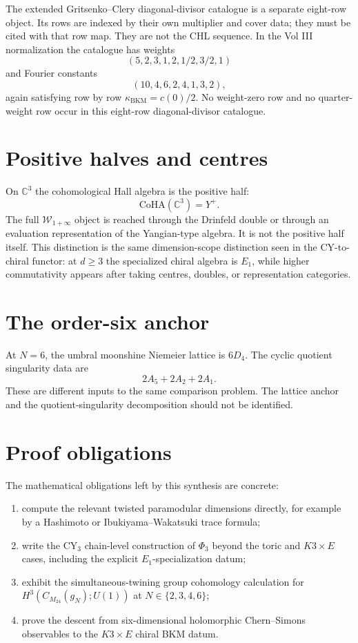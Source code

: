 \documentclass[11pt]{article}
\providecommand{\C}{\mathbb{C}}
\providecommand{\CoHA}{\mathrm{CoHA}}
\providecommand{\Yplus}{Y^+}
\providecommand{\kBKM}{\kappa_{\mathrm{BKM}}}
\begin{document}
The extended Gritsenko--Clery diagonal-divisor catalogue is a separate
eight-row object.  Its rows are indexed by their own multiplier and
cover data; they must be cited with that row map. They are not the
CHL sequence.  In the Vol III normalization the catalogue has
weights
\[
  (5,2,3,1,2,1/2,3/2,1)
\]
and Fourier constants
\[
  (10,4,6,2,4,1,3,2),
\]
again satisfying row by row $\kBKM=c(0)/2$.  No weight-zero row and no
quarter-weight row occur in this eight-row diagonal-divisor catalogue.

\section{Positive halves and centres}

On $\C^3$ the cohomological Hall algebra is the positive half:
\[
  \CoHA(\C^3)=\Yplus .
\]
The full $\mathcal W_{1+\infty}$ object is reached through the
Drinfeld double or through an evaluation representation of the
Yangian-type algebra.  It is not the positive half itself.  This
distinction is the same dimension-scope distinction seen in the
CY-to-chiral functor: at $d \geq 3$ the specialized chiral algebra is
$E_1$, while higher commutativity appears after taking centres,
doubles, or representation categories.

\section{The order-six anchor}

At $N=6$, the umbral moonshine Niemeier lattice is $6D_4$.  The cyclic
quotient singularity data are
\[
  2A_5+2A_2+2A_1 .
\]
These are different inputs to the same comparison problem.  The lattice
anchor and the quotient-singularity decomposition should not be
identified.

\section{Proof obligations}

The mathematical obligations left by this synthesis are concrete:
\begin{enumerate}
  \item compute the relevant twisted paramodular dimensions directly,
  for example by a Hashimoto or Ibukiyama--Wakatsuki trace formula;
  \item write the CY$_3$ chain-level construction of $\Phi_3$ beyond
  the toric and $K3 \times E$ cases, including the explicit
  $E_1$-specialization datum;
  \item exhibit the simultaneous-twining group cohomology calculation
  for $H^3(C_{M_{24}}(g_N);U(1))$ at $N\in\{2,3,4,6\}$;
  \item prove the descent from six-dimensional holomorphic
  Chern--Simons observables to the $K3 \times E$ chiral BKM datum.
\end{enumerate}
\end{document}
